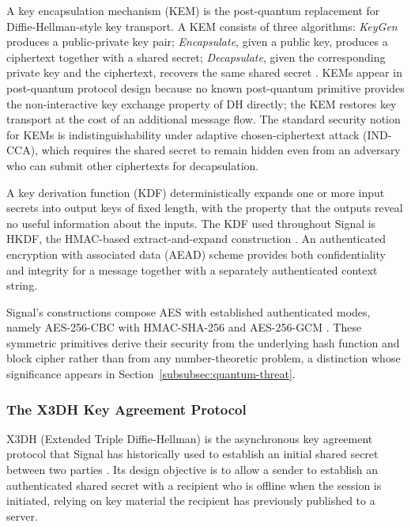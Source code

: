 A key encapsulation mechanism (KEM) is the post-quantum replacement for Diffie-Hellman-style key transport. A KEM consists of three algorithms: \textit{KeyGen} produces a public-private key pair; \textit{Encapsulate}, given a public key, produces a ciphertext together with a shared secret; \textit{Decapsulate}, given the corresponding private key and the ciphertext, recovers the same shared secret \cite{national_institute_of_standards_and_technology_us_module-lattice-based_2024-1}. KEMs appear in post-quantum protocol design because no known post-quantum primitive provides the non-interactive key exchange property of DH directly; the KEM restores key transport at the cost of an additional message flow. The standard security notion for KEMs is indistinguishability under adaptive chosen-ciphertext attack (IND-CCA), which requires the shared secret to remain hidden even from an adversary who can submit other ciphertexts for decapsulation.

A key derivation function (KDF) deterministically expands one or more input secrets into output keys of fixed length, with the property that the outputs reveal no useful information about the inputs. The KDF used throughout Signal is HKDF, the HMAC-based extract-and-expand construction \cite{krawczyk_hmac-based_2010}. An authenticated encryption with associated data (AEAD) scheme provides both confidentiality and integrity for a message together with a separately authenticated context string.

Signal's constructions compose AES with established authenticated modes, namely AES-256-CBC with HMAC-SHA-256 and AES-256-GCM \cite{rogaway_authenticated-encryption_2002}. These symmetric primitives derive their security from the underlying hash function and block cipher rather than from any number-theoretic problem, a distinction whose significance appears in Section~\ref{subsubsec:quantum-threat}.

\subsubsection{The X3DH Key Agreement Protocol}
\label{subsubsec:x3dh}

X3DH (Extended Triple Diffie-Hellman) is the asynchronous key agreement protocol that Signal has historically used to establish an initial shared secret between two parties \cite{marlinspike_x3dh_nodate}. Its design objective is to allow a sender to establish an authenticated shared secret with a recipient who is offline when the session is initiated, relying on key material the recipient has previously published to a server.


